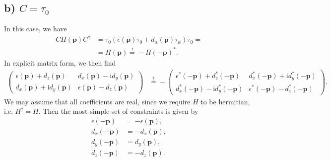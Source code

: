 \documentclass[english, parskip=full]{scrartcl}
\newcommand{\kla}{}
\newcommand{\klam}{}
\renewcommand{\i}{\text{i}}
\begin{document}
\subsection*{b) $C=\tau_0$}
In this case, we have
\begin{align}
CH(\mathbf{p})C^\dagger &= \tau_0 \kla\left( \epsilon(\mathbf{p}) \tau_0 + d_\alpha (\mathbf{p}) \tau_\alpha \right) \tau_0 = \\
&= H(\mathbf{p}) \overset{!}{=} -H(-\mathbf{p})^\ast.
\end{align}
In explicit matrix form, we then find
\begin{align}
\begin{pmatrix}
\epsilon (\mathbf{p}) + d_z(\mathbf{p}) & d_x(\mathbf{p}) - \i d_y (\mathbf{p}) \\ 
d_x (\mathbf{p}) + \i d_y(\mathbf{p}) & \epsilon(\mathbf{p}) - d_z (\mathbf{p})
\end{pmatrix} &\overset{!}{=} -\begin{pmatrix}
\epsilon^\ast (-\mathbf{p}) + d_z^\ast(-\mathbf{p}) & d_x^\ast(-\mathbf{p}) + \i d_y^\ast(-\mathbf{p}) \\ 
d_x^\ast (-\mathbf{p})  - \i d_y^\ast(-\mathbf{p}) & \epsilon^\ast(-\mathbf{p}) - d_z^\ast (-\mathbf{p})
\end{pmatrix}.
\end{align}
We may assume that all coefficients are real, since we require $H$ to be hermitian, i.e. $H^\dagger = H$.
Then the most simple set of constraints is given by
\begin{align}
\epsilon (-\mathbf{p}) &= -\epsilon (\mathbf{p}),\\
d_x (-\mathbf{p}) &= -d_x (\mathbf{p}),\\
d_y (-\mathbf{p}) &= d_y (\mathbf{p}),\\
d_z (-\mathbf{p}) &= -d_z (\mathbf{p}).
\end{align}

\end{document}
